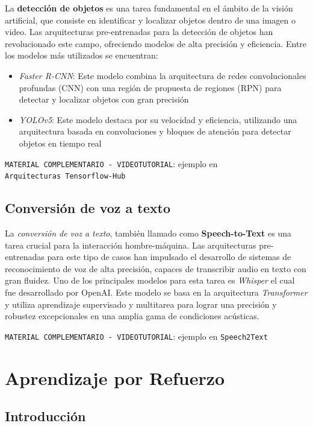 \documentclass[
  a4paper,
  DIV=11,
  numbers=noendperiod]{scrreprt}
\providecommand{\tightlist}{%
  \setlength{\itemsep}{0pt}\setlength{\parskip}{0pt}}\usepackage{longtable,booktabs,array}
\begin{document}
La \textbf{detección de objetos} es una tarea fundamental en el ámbito
de la visión artificial, que consiste en identificar y localizar objetos
dentro de una imagen o video. Las arquitecturas pre-entrenadas para la
detección de objetos han revolucionado este campo, ofreciendo modelos de
alta precisión y eficiencia. Entre los modelos más utilizados se
encuentran:

\begin{itemize}
\tightlist
\item
  \emph{Faster R-CNN}: Este modelo combina la arquitectura de redes
  convolucionales profundas (CNN) con una región de propuesta de
  regiones (RPN) para detectar y localizar objetos con gran precisión
\item
  \emph{YOLOv5}: Este modelo destaca por su velocidad y eficiencia,
  utilizando una arquitectura basada en convoluciones y bloques de
  atención para detectar objetos en tiempo real
\end{itemize}

\texttt{MATERIAL\ COMPLEMENTARIO\ -\ VIDEOTUTORIAL}: ejemplo en
\texttt{Arquitecturas\ Tensorflow-Hub}

\subsection{Conversión de voz a
texto}\label{conversiuxf3n-de-voz-a-texto}

La \emph{conversión de voz a texto}, también llamado como
\textbf{Speech-to-Text} es una tarea crucial para la interacción
hombre-máquina. Las arquitecturas pre-entrenadas para este tipo de casos
han impulsado el desarrollo de sistemas de reconocimiento de voz de alta
precisión, capaces de transcribir audio en texto con gran fluidez. Uno
de los principales modelos para esta tarea es \emph{Whisper} el cual fue
desarrollado por OpenAI. Este modelo se basa en la arquitectura
\emph{Transformer} y utiliza aprendizaje supervisado y multitarea para
lograr una precisión y robustez excepcionales en una amplia gama de
condiciones acústicas.

\texttt{MATERIAL\ COMPLEMENTARIO\ -\ VIDEOTUTORIAL}: ejemplo en
\texttt{Speech2Text}

\section{Aprendizaje por Refuerzo}\label{aprendizaje-por-refuerzo}

\subsection{Introducción}\label{introducciuxf3n-2}
\end{document}
